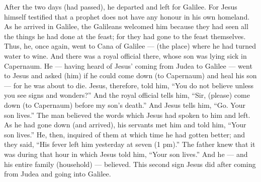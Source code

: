 \begin{pages}
\begin{Leftside}
		\pend
		\pstart
		After the two days (had passed), he departed and left for Galilee. For Jesus himself testified that a prophet does not have any honour in his own homeland. As he arrived in Galilee, the Galileans welcomed him because they had seen all the things he had done at the feast; for they had gone to the feast themselves. 
		\pend
		\pstart
		Thus, he, once again, went to Cana of Galilee — (the place) where he had turned water to wine. And there was a royal official there, whose son was lying sick in Capernaum. He — having heard of Jesus’ coming from Judea to Galilee — went to Jesus and asked (him) if he could come down (to Capernaum) and heal his son — for he was about to die. Jesus, therefore, told him, “You do not believe unless you see signs and wonders?” And the royal official tells him, “Sir, (please) come down (to Capernaum) before my son’s death.” And Jesus tells him, “Go. Your son lives.” The man believed the words which Jesus had spoken to him and left. As he had gone down (and arrived), his servants met him and told him, “Your son lives.” He, then, inquired of them at which time he had gotten better; and they said, “His fever left him yesterday at seven (1 pm).” The father knew that it was during that hour in which Jesus told him, “Your son lives.” And he — and his entire family (household) — believed. This second sign Jesus did after coming from Judea and going into Galilee.
		\pend
        \endnumbering
    \end{Leftside}
\end{pages} 
\Pages

